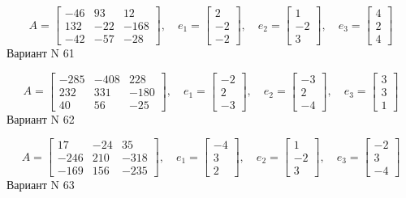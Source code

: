 \documentclass[11pt]{report}
\begin{document}
$$A = \left[\begin{matrix}-46 & 93 & 12\\132 & -22 & -168\\-42 & -57 & -28\end{matrix}\right],\quad e_1 = \left[\begin{matrix}2\\-2\\-2\end{matrix}\right],\quad e_2 = \left[\begin{matrix}1\\-2\\3\end{matrix}\right],\quad e_3 = \left[\begin{matrix}4\\2\\4\end{matrix}\right]$$Вариант N 61

$$A = \left[\begin{matrix}-285 & -408 & 228\\232 & 331 & -180\\40 & 56 & -25\end{matrix}\right],\quad e_1 = \left[\begin{matrix}-2\\2\\-3\end{matrix}\right],\quad e_2 = \left[\begin{matrix}-3\\2\\-4\end{matrix}\right],\quad e_3 = \left[\begin{matrix}3\\3\\1\end{matrix}\right]$$Вариант N 62

$$A = \left[\begin{matrix}17 & -24 & 35\\-246 & 210 & -318\\-169 & 156 & -235\end{matrix}\right],\quad e_1 = \left[\begin{matrix}-4\\3\\2\end{matrix}\right],\quad e_2 = \left[\begin{matrix}1\\-2\\3\end{matrix}\right],\quad e_3 = \left[\begin{matrix}-2\\3\\-4\end{matrix}\right]$$Вариант N 63
\end{document}
